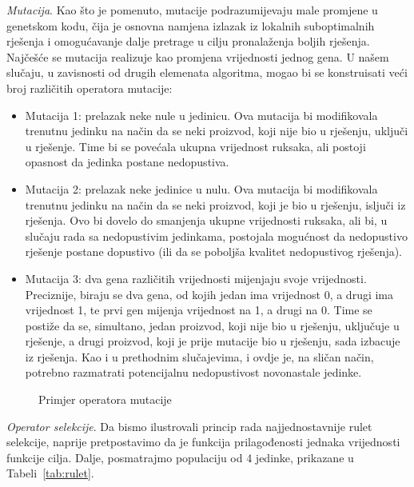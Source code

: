 \documentclass[a4paper, utf8, 11pt, colorlinks]{book}
\begin{document}
\emph{Mutacija}. Kao što je pomenuto, mutacije podrazumijevaju male promjene u genetskom kodu, čija je osnovna namjena izlazak iz lokalnih suboptimalnih rješenja i omogućavanje dalje pretrage u cilju pronalaženja boljih rješenja. Najčešće se mutacija realizuje kao promjena vrijednosti jednog gena. U našem slučaju, u zavisnosti od drugih elemenata algoritma, mogao bi se konstruisati veći broj različitih operatora mutacije: 
\begin{itemize}
	\item Mutacija 1: prelazak neke nule u jedinicu. Ova mutacija bi modifikovala trenutnu jedinku na način da se neki proizvod, koji nije bio u rješenju, uključi u rješenje. Time bi se povećala ukupna vrijednost ruksaka, ali postoji opasnost da jedinka postane nedopustiva.
	\item  Mutacija 2: prelazak neke jedinice u nulu. Ova mutacija bi modifikovala trenutnu jedinku na način da se neki proizvod, koji je bio u rješenju, isljuči iz rješenja. Ovo bi dovelo do smanjenja ukupne vrijednosti ruksaka, ali bi, u slučaju rada sa nedopustivim jedinkama, postojala mogućnost da nedopustivo rješenje postane dopustivo (ili da se poboljša kvalitet nedopustivog rješenja).
	\item  Mutacija 3: dva gena različitih vrijednosti mijenjaju svoje vrijednosti. Preciznije, biraju se dva gena, od kojih jedan ima vrijednost 0, a drugi ima vrijednost 1, te prvi gen mijenja vrijednost na 1, a drugi na 0. Time se postiže da se, simultano, jedan proizvod, koji nije bio u rješenju, uključuje u rješenje, a drugi proizvod, koji je prije mutacije bio u rješenju, sada izbacuje iz rješenja. Kao i u prethodnim slučajevima, i ovdje je, na sličan način, potrebno razmatrati potencijalnu nedopustivost novonastale jedinke.
\end{itemize}





\begin{figure}
	\caption{Primjer operatora mutacije}
\end{figure}

\emph{Operator selekcije}. Da bismo ilustrovali princip rada najjednostavnije rulet selekcije, naprije pretpostavimo da je funkcija prilagođenosti jednaka vrijednosti funkcije cilja. Dalje, posmatrajmo populaciju od 4 jedinke, prikazane u Tabeli~\ref{tab:rulet}.
\end{document}
